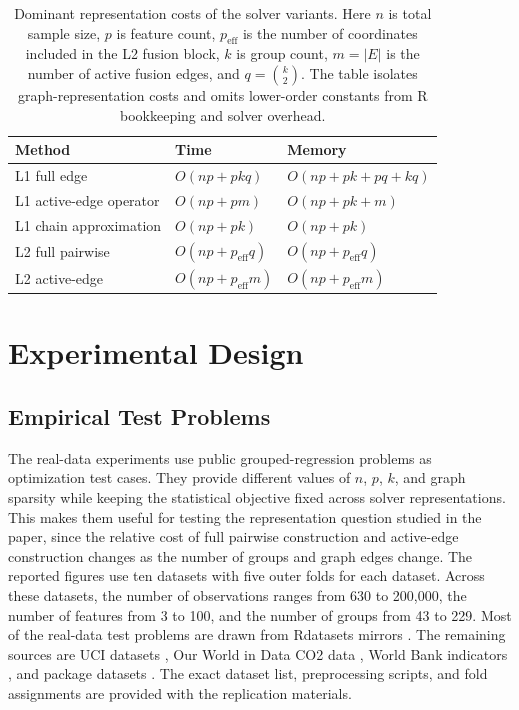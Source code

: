 \documentclass[twoside,11pt]{article}
\begin{document}
\begin{table}[t]
\centering
\caption{Dominant representation costs of the solver variants. Here
$n$ is total sample size, $p$ is feature count, $p_{\mathrm{eff}}$ is the
number of coordinates included in the L2 fusion block, $k$ is group count,
$m=|E|$ is the number of active fusion edges, and $q=\binom{k}{2}$. The table
isolates graph-representation costs and omits lower-order constants from R
bookkeeping and solver overhead.}
\label{tab:complexity}
\begin{tabular}{lll}
\toprule
Method & Time & Memory \\
\midrule
L1 full edge & $O(np+pkq)$ & $O(np+pk+pq+kq)$ \\
L1 active-edge operator & $O(np+pm)$ & $O(np+pk+m)$ \\
L1 chain approximation & $O(np+pk)$ & $O(np+pk)$ \\
\midrule
L2 full pairwise & $O(np+p_{\mathrm{eff}}q)$ & $O(np+p_{\mathrm{eff}}q)$ \\
L2 active-edge & $O(np+p_{\mathrm{eff}}m)$ & $O(np+p_{\mathrm{eff}}m)$ \\
\bottomrule
\end{tabular}
\end{table}

\section{Experimental Design}

\subsection{Empirical Test Problems}

The real-data experiments use public grouped-regression problems as
optimization test cases. They provide different values of $n$, $p$, $k$, and
graph sparsity while keeping the statistical objective fixed across solver
representations. This makes them useful for testing the representation
question studied in the paper, since the relative cost of full pairwise
construction and active-edge construction changes as the number of groups and
graph edges change. The reported figures use ten datasets with five outer
folds for each dataset. Across these datasets, the number of observations
ranges from 630 to 200,000, the number of features from 3 to 100, and the
number of groups from 43 to 229. Most of the real-data test problems are drawn
from Rdatasets mirrors \citep{rdatasets}. The remaining sources are UCI
datasets \citep{uci_communities,uci_electricity}, Our World in Data CO2 data
\citep{owidco2}, World Bank indicators \citep{worldbankwdi}, and package
datasets \citep{pinheiro2000mixed,raudenbush2002hlm}. The exact dataset list,
preprocessing scripts, and fold assignments are provided with the replication
materials.
\end{document}
